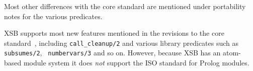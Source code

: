 Most other differences with the core standard are mentioned under
portability notes for the various predicates.  


XSB supports most new features mentioned in the revisions to the core
standard~\cite{ISO-Revision}, including {\tt call\_cleanup/2} and
various library predicates such as {\tt subsumes/2}, {\tt
  numbervars/3} and so on.
However, because XSB has an atom-based module system it does {\em not}
support the ISO standard for Prolog modules.

